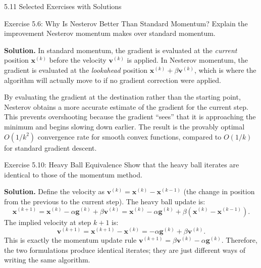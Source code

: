 \documentclass[aspectratio=169,10pt]{beamer}
\newcommand{\vx}{\mathbf{x}}
\newcommand{\vg}{\mathbf{g}}
\newcommand{\vv}{\mathbf{v}}
\begin{document}
\begin{frame}[allowframebreaks]{5.11 Selected Exercises with Solutions}
  \bigskip
  \begin{block}{Exercise 5.6: Why Is Nesterov Better Than Standard Momentum?}
    Explain the improvement Nesterov momentum makes over standard
    momentum.
  \end{block}

  \textbf{Solution.}  In standard momentum, the gradient is evaluated
  at the \emph{current} position $\vx^{(k)}$ before the velocity
  $\vv^{(k)}$ is applied.  In Nesterov momentum, the gradient is
  evaluated at the \emph{lookahead} position
  $\vx^{(k)} + \beta\vv^{(k)}$, which is where the algorithm will
  actually move to if no gradient correction were applied.

  By evaluating the gradient at the destination rather than the
  starting point, Nesterov obtains a more accurate estimate of
  the gradient for the current step.  This prevents overshooting
  because the gradient ``sees'' that it is approaching the minimum
  and begins slowing down earlier.  The result is the provably
  optimal $O(1/k^2)$ convergence rate for smooth convex functions,
  compared to $O(1/k)$ for standard gradient descent.

  \framebreak

  \begin{block}{Exercise 5.10: Heavy Ball Equivalence}
    Show that the heavy ball iterates are identical to those of
    the momentum method.
  \end{block}

  \textbf{Solution.}  Define the velocity as
  $\vv^{(k)} = \vx^{(k)} - \vx^{(k-1)}$ (the change in position
  from the previous to the current step).  The heavy ball update is:
  \[
    \vx^{(k+1)} = \vx^{(k)} - \alpha\vg^{(k)} + \beta\vv^{(k)}
    = \vx^{(k)} - \alpha\vg^{(k)} + \beta\!\left(\vx^{(k)}-\vx^{(k-1)}\right).
  \]
  The implied velocity at step $k+1$ is:
  \[
    \vv^{(k+1)} = \vx^{(k+1)} - \vx^{(k)}
    = -\alpha\vg^{(k)} + \beta\vv^{(k)}.
  \]
  This is exactly the momentum update rule
  $\vv^{(k+1)} = \beta\vv^{(k)} - \alpha\vg^{(k)}$.
  Therefore, the two formulations produce identical iterates;
  they are just different ways of writing the same algorithm.

\end{frame}
\end{document}
